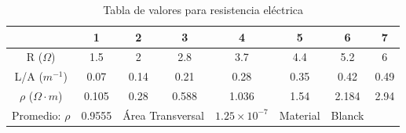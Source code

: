 \documentclass[letterpaper, 12pt]{report}
\begin{document}
\begin{table}[H]
	\centering
	\caption{Tabla de valores para resistencia eléctrica}
	\label{tabla-resistencia 2da Medicion}
	\begin{tabular}{cccccccc}
		\toprule
		                          & 1      & 2                                    & 3                     & 4        & 5      & 6     & 7    \\
		\midrule
		R ($\Omega$)              & 1.5    & 2                                    & 2.8                   & 3.7      & 4.4    & 5.2   & 6    \\
		L/A ($m^{-1}$)            & 0.07   & 0.14                                 & 0.21                  & 0.28     & 0.35   & 0.42  & 0.49 \\
		$\rho$ ($\Omega \cdot m$) & 0.105  & 0.28                                 & 0.588                 & 1.036    & 1.54   & 2.184 & 2.94 \\
		Promedio: $\rho$          & 0.9555 & \multicolumn{2}{c}{Área Transversal} & $1.25 \times 10^{-7}$ & Material & Blanck                \\
		\bottomrule
	\end{tabular}
\end{table}

\end{document}
